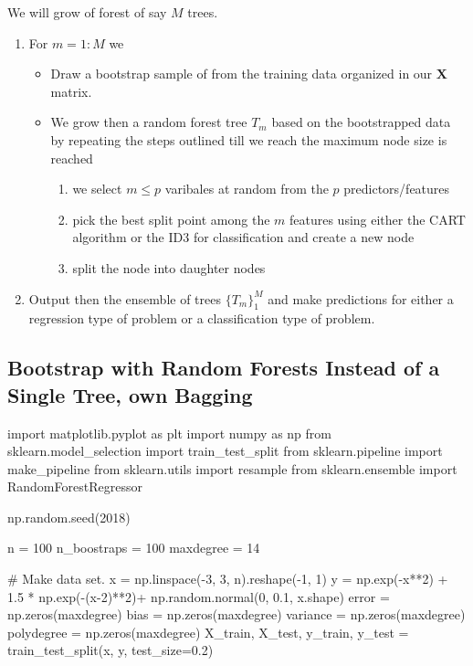 \documentclass[%
oneside,                 %
final,                   %
10pt]{article}
\begin{document}
We will grow of forest of say $M$ trees.
\begin{enumerate}
\item For $m=1:M$ we
\begin{itemize}

  \item Draw a bootstrap sample of from the training data organized in our $\bm{X}$ matrix.

  \item We grow then a random forest tree $T_m$ based on the bootstrapped data by repeating the steps outlined till we reach the maximum node size is reached
\begin{enumerate}

   \item we select $m \le p$ varibales at random from the $p$ predictors/features

   \item pick the best split point among the $m$ features using either the CART algorithm or the ID3 for classification and create a new node

   \item split the node into daughter nodes

\end{enumerate}

\noindent
\end{itemize}

\noindent
\item Output then the ensemble of trees $\{T_m\}_1^{M}$ and make predictions for either a regression type of problem or a classification type of problem. 
\end{enumerate}

\noindent
\subsection{Bootstrap with Random Forests Instead of a Single Tree, own Bagging}

\bpycod

import matplotlib.pyplot as plt
import numpy as np
from sklearn.model_selection import train_test_split
from sklearn.pipeline import make_pipeline
from sklearn.utils import resample
from sklearn.ensemble import RandomForestRegressor

np.random.seed(2018)

n = 100
n_boostraps = 100
maxdegree = 14

# Make data set.
x = np.linspace(-3, 3, n).reshape(-1, 1)
y = np.exp(-x**2) + 1.5 * np.exp(-(x-2)**2)+ np.random.normal(0, 0.1, x.shape)
error = np.zeros(maxdegree)
bias = np.zeros(maxdegree)
variance = np.zeros(maxdegree)
polydegree = np.zeros(maxdegree)
X_train, X_test, y_train, y_test = train_test_split(x, y, test_size=0.2)
\end{document}
